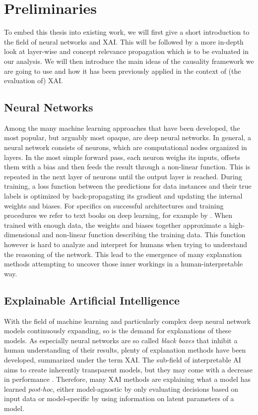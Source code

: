 \chapter{Preliminaries}\label{chapter:background}

To embed this thesis into existing work, we will first give a short introduction to the field of neural networks and XAI. This will be followed by a more in-depth look at layer-wise and concept relevance propagation which is to be evaluated in our analysis. We will then introduce the main ideas of the causality framework we are going to use and how it has been previously applied in the context of (the evaluation of) XAI. 


\section{Neural Networks}
Among the many machine learning approaches that have been developed, the most popular, but arguably most opaque, are deep neural networks. In general, a neural network consists of neurons, which are computational nodes organized in layers. In the most simple forward pass, each neuron weighs its inputs, offsets them with a bias and then feeds the result through a non-linear function. This is repeated in the next layer of neurons until the output layer is reached. During training, a loss function between the predictions for data instances and their true labels is optimized by back-propagating its gradient and updating the internal weights and biases. For specifics on successful architectures and training procedures we refer to text books on deep learning, for example by \cite{Goodfellow2016}. When trained with enough data, the weights and biases together approximate a high-dimensional and non-linear function describing the training data. This function however is hard to analyze and interpret for humans when trying to understand the reasoning of the network. This lead to the emergence of many explanation methods attempting to uncover those inner workings in a human-interpretable way.


\section{Explainable Artificial Intelligence}
With the field of machine learning and particularly complex deep neural network models continuously expanding, so is the demand for explanations of these models.
As especially neural networks are so called \textit{black boxes} that inhibit a human understanding of their results, plenty of explanation methods have been developed, summarized under the term XAI. The sub-field of interpretable AI aims to create inherently transparent models, but they may come with a decrease in performance \cite{Lipton2018}. Therefore, many XAI methods are explaining what a model has learned \textit{post-hoc}, either model-agnostic by only evaluating decisions based on input data or model-specific by using information on latent parameters of a model.


